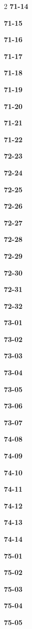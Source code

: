 \documentclass[10pt,a4paper]{article}
\begin{document}
\begin{multicols}{2}
\noindent\textbf{71-14}\ \par
\noindent\textbf{71-15}\ \par
\noindent\textbf{71-16}\ \par
\noindent\textbf{71-17}\ \par
\noindent\textbf{71-18}\ \par
\noindent\textbf{71-19}\ \par
\noindent\textbf{71-20}\ \par
\noindent\textbf{71-21}\ \par
\noindent\textbf{71-22}\ \par
\noindent\textbf{72-23}\ \par
\noindent\textbf{72-24}\ \par
\noindent\textbf{72-25}\ \par
\noindent\textbf{72-26}\ \par
\noindent\textbf{72-27}\ \par
\noindent\textbf{72-28}\ \par
\noindent\textbf{72-29}\ \par
\noindent\textbf{72-30}\ \par
\noindent\textbf{72-31}\ \par
\noindent\textbf{72-32}\ \par
\noindent\textbf{73-01}\ \par
\noindent\textbf{73-02}\ \par
\noindent\textbf{73-03}\ \par
\noindent\textbf{73-04}\ \par
\noindent\textbf{73-05}\ \par
\noindent\textbf{73-06}\ \par
\noindent\textbf{73-07}\ \par
\noindent\textbf{74-08}\ \par
\noindent\textbf{74-09}\ \par
\noindent\textbf{74-10}\ \par
\noindent\textbf{74-11}\ \par
\noindent\textbf{74-12}\ \par
\noindent\textbf{74-13}\ \par
\noindent\textbf{74-14}\ \par
\noindent\textbf{75-01}\ \par
\noindent\textbf{75-02}\ \par
\noindent\textbf{75-03}\ \par
\noindent\textbf{75-04}\ \par
\noindent\textbf{75-05}\ \par

\end{multicols}
\end{document}
